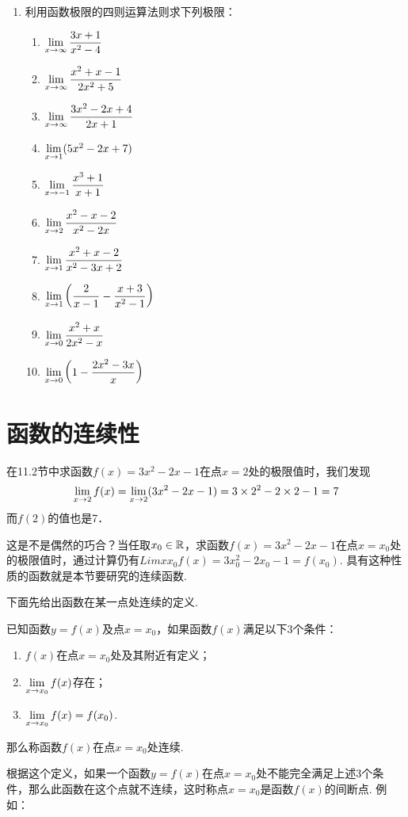 \begin{enumerate}
\item 利用函数极限的四则运算法则求下列极限：
\begin{multicols}{2}
\begin{enumerate}[(1)]
    \item $\lim\limits_{x\to \infty}\dfrac{3x+1}{x^2-4}$
    \item $\lim\limits_{x\to \infty}\dfrac{x^2+x-1}{2x^2+5}$
    \item $\lim\limits_{x\to \infty}\dfrac{3x^2-2x+4}{2x+1}$
    \item $\lim\limits_{x\to 1}(5x^2-2x+7)$
    \item $\lim\limits_{x\to -1}\dfrac{x^3+1}{x+1}$
    \item $\lim\limits_{x\to 2}\dfrac{x^2-x-2}{x^2-2x}$
    \item $\lim\limits_{x\to 1}\dfrac{x^2+x-2}{x^2-3x+2}$
    \item $\lim\limits_{x\to 1}\left(\dfrac{2}{x-1}-\dfrac{x+3}{x^2-1}\right)$
    \item $\lim\limits_{x\to 0}\dfrac{x^2+x}{2x^2-x}$
    \item $\lim\limits_{x\to 0}\left(1-\dfrac{2x^2-3x}{x}\right)$
\end{enumerate}
\end{multicols}
\end{enumerate}

\section{函数的连续性}
在11.2节中求函数$f(x)=3x^2-2x-1$在点$x=2$处的极限值时，我们发现
\[\lim_{x\to 2}f(x)=\lim_{x\to 2}(3x^2-2x-1)=3\times2^2-2\times2-1=7\]
而$f(2)$的值也是7．

这是不是偶然的巧合？当任取$x_0\in\mathbb{R}$，求函数$f(x)=3x^2-2x-1$在点$x=x_0$处的极限值时，通过计算仍有$Lim{x}{x_0}f(x)=3x^2_0-2x_0-1=f(x_0)$. 具有这种性质的函数就是本节要研究的连续函数.

下面先给出函数在某一点处连续的定义.

已知函数$y=f(x)$及点$x=x_0$，如果函数$f(x)$满足以下3个条件：
\begin{enumerate}
\item $f(x)$在点$x=x_0$处及其附近有定义；
\item $\lim\limits_{x\to x_0}f(x)$存在；
\item $\lim\limits_{x\to x_0}f(x)=f(x_0)$.
\end{enumerate}

那么称函数$f(x)$在点$x=x_0$处连续.

根据这个定义，如果一个函数$y=f(x)$在点$x=x_0$处不能完全满足上述3个条件，那么此函数在这个点就不连续，这时称点$x=x_0$是函数$f(x)$的间断点. 例如：

